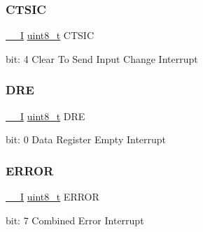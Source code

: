 \subsubsection{\texorpdfstring{CTSIC}{CTSIC}}
{\footnotesize\ttfamily \mbox{\hyperlink{core__cm0plus_8h_af63697ed9952cc71e1225efe205f6cd3}{\+\_\+\+\_\+I}} \mbox{\hyperlink{union_s_e_r_c_o_m___u_s_a_r_t___i_n_t_f_l_a_g___type_a5b4208c6f4c4a4290c4f2804d1eb1d5b}{uint8\+\_\+t}} C\+T\+S\+IC}

bit\+: 4 Clear To Send Input Change Interrupt \mbox{\label{union_s_e_r_c_o_m___u_s_a_r_t___i_n_t_f_l_a_g___type_a3e0c17296e30aaa4ad96a7effe9a00b0}} 
\subsubsection{\texorpdfstring{DRE}{DRE}}
{\footnotesize\ttfamily \mbox{\hyperlink{core__cm0plus_8h_af63697ed9952cc71e1225efe205f6cd3}{\+\_\+\+\_\+I}} \mbox{\hyperlink{union_s_e_r_c_o_m___u_s_a_r_t___i_n_t_f_l_a_g___type_a5b4208c6f4c4a4290c4f2804d1eb1d5b}{uint8\+\_\+t}} D\+RE}

bit\+: 0 Data Register Empty Interrupt \mbox{\label{union_s_e_r_c_o_m___u_s_a_r_t___i_n_t_f_l_a_g___type_ab083f63120ce20369e2dbb0081da16e3}} 
\subsubsection{\texorpdfstring{ERROR}{ERROR}}
{\footnotesize\ttfamily \mbox{\hyperlink{core__cm0plus_8h_af63697ed9952cc71e1225efe205f6cd3}{\+\_\+\+\_\+I}} \mbox{\hyperlink{union_s_e_r_c_o_m___u_s_a_r_t___i_n_t_f_l_a_g___type_a5b4208c6f4c4a4290c4f2804d1eb1d5b}{uint8\+\_\+t}} E\+R\+R\+OR}

bit\+: 7 Combined Error Interrupt \mbox{\label{union_s_e_r_c_o_m___u_s_a_r_t___i_n_t_f_l_a_g___type_a9428adc9af4653a2050e2536b55dec8d}} 
